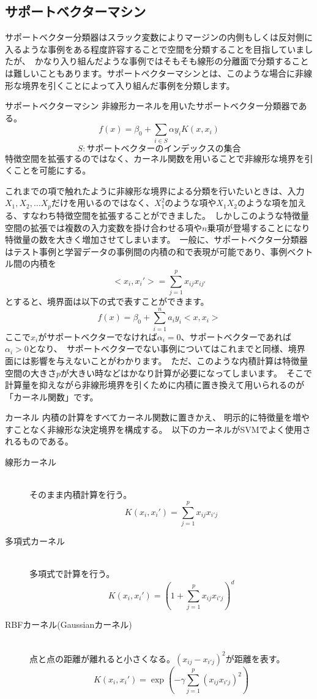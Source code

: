 \documentclass[uplatex]{jsarticle}
\begin{document}
\subsection{サポートベクターマシン}
サポートベクター分類器はスラック変数によりマージンの内側もしくは反対側に入るような事例をある程度許容することで空間を分類することを目指していましたが、\
かなり入り組んだような事例ではそもそも線形の分離面で分類することは難しいこともあります。サポートベクターマシンとは、このような場合に非線形な境界を引くことによって入り組んだ事例を分類します。\
\begin{itembox}[l]{サポートベクターマシン}
  非線形カーネルを用いたサポートベクター分類器である。
  $$f(x) = \beta_0 + \sum_{i \in S}\alpha y_i K(x, x_i)$$
  $$S: サポートベクターのインデックスの集合$$
  特徴空間を拡張するのではなく、カーネル関数を用いることで非線形な境界を引くことを可能にする。
\end{itembox}
これまでの項で触れたように非線形な境界による分類を行いたいときは、入力$X_1, X_2, \dots X_p$だけを用いるのではなく、$X_1^2のような項やX_1X_2$のような項を加える、すなわち特徴空間を拡張することができました。\
しかしこのような特徴量空間の拡張では複数の入力変数を掛け合わせる項や$n$乗項が登場することになり特徴量の数を大きく増加させてしまいます。\
一般に、サポートベクター分類器はテスト事例と学習データの事例間の内積の和で表現が可能であり、事例ベクトル間の内積を
$$<x_i, x_i'> = \sum_{j=1}^p x_{ij}x_{ij'}$$とすると、境界面は以下の式で表すことができます。
$$f(x) = \beta_0 + \sum_{i=1}^n a_iy_i<x, x_i>$$
ここで$x_i$がサポートベクターでなければ$\alpha_i = 0$、サポートベクターであれば$\alpha_i > 0$となり、\
サポートベクターでない事例についてはこれまでと同様、境界面には影響を与えないことがわかります。\
ただ、このような内積計算は特徴量空間の大きさ$p$が大きい時などはかなり計算が必要になってしまいます。\
そこで計算量を抑えながら非線形境界を引くために内積に置き換えて用いられるのが「カーネル関数」です。\
\begin{itembox}[l]{カーネル}
  内積の計算をすべてカーネル関数に置きかえ、 明示的に特徴量を増やすことなく非線形な決定境界を構成する。\
  以下のカーネルがSVMでよく使用されるものである。
  \begin{description}
    \item[線形カーネル]\mbox{}\\
    そのまま内積計算を行う。
    $$K(x_i, x_i') = \sum_{j=1}^px_{ij}x_{i'j}$$
    \item[多項式カーネル]\mbox{}\\
    多項式で計算を行う。
    $$K(x_i, x_i') = (1 + \sum_{j=1}^px_{ij}x_{i'j})^d$$
    \item[RBFカーネル(Gaussianカーネル)]\mbox{}\\
    点と点の距離が離れると小さくなる。$(x_{ij} - x_{i'j})^2$が距離を表す。
    $$K(x_i, x_i') = \exp{\left(-\gamma\sum_{j=1}^p(x_{ij}x_{i'j})^2\right)}$$
  \end{description}
\end{itembox}
\end{document}
